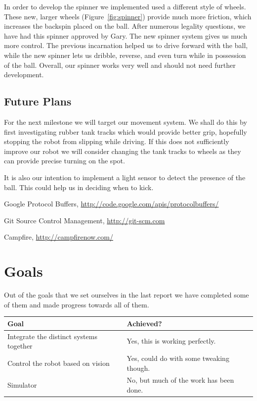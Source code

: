 \documentclass[12pt, a4paper, titlepage]{article}
\begin{document}
In order to develop the spinner we implemented used a different style of wheels.
These new, larger wheels (Figure~\ref{fig:spinner}) provide much more friction,
which increases the backspin placed on the ball. After numerous legality
questions, we have had this spinner approved by Gary. The new spinner system
gives us much more control. The previous incarnation helped us to drive forward
with the ball, while the new spinner lets us dribble, reverse, and even turn
while in possession of the ball. Overall, our spinner works very well and should
not need further development.

\subsection{Future Plans}

For the next milestone we will target our movement system. We shall do this
by first investigating rubber tank tracks which would provide better grip,
hopefully stopping the robot from slipping while driving. If this does not
sufficiently improve our robot we will consider changing the tank tracks to
wheels as they can provide precise turning on the spot.

It is also our intention to implement a light sensor to detect the presence of
the ball. This could help us in deciding when to kick.

\newpage

\setcounter{section}{5}
\begin{thebibliography}{9}

	Google Protocol Buffers,
	\url{http://code.google.com/apis/protocolbuffers/}

	Git Source Control Management,
	\url{http://git-scm.com}

	Campfire,
	\url{http://campfirenow.com/}

\end{thebibliography}

\appendix

\section{Goals}

Out of the goals that we set ourselves in the last report we have completed some
of them and made progress towards all of them.

\begin{tabular}{| l | l |}
  \hline
  \textbf{Goal}                           & \textbf{Achieved?}                       \\
  \hline
  Integrate the distinct systems together & Yes, this is working perfectly.          \\
  Control the robot based on vision       & Yes, could do with some tweaking though. \\
  Simulator                               & No, but much of the work has been done.  \\
  \hline
\end{tabular}
\end{document}
